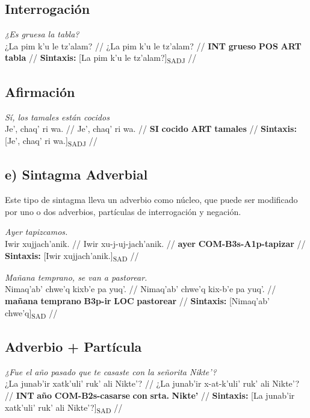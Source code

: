 \documentclass{article}%
\begin{document}
\subsection{Interrogación}%
\label{subsec:Interrogacin}%

%
\par\medskip%
\ex
\textit{¿Es gruesa la tabla?} \\
\begingl
\gla ¿La pim k'u le tz'alam? //
\glb ¿La pim k'u le tz'alam? //
\glc \textbf{INT} \textbf{grueso} \textbf{POS} \textbf{ART} \textbf{tabla} //
\glft \textbf{Sintaxis:} [La pim k'u le tz'alam?]\textsubscript{SADJ} //
\endgl
\xe
%
\medskip%
\subsection{Afirmación}%
\label{subsec:Afirmacin}%

%
\par\medskip%
\ex
\textit{Sí, los tamales están cocidos} \\
\begingl
\gla Je', chaq' ri wa. //
\glb Je', chaq' ri wa. //
\glc \textbf{SI} \textbf{cocido} \textbf{ART} \textbf{tamales} //
\glft \textbf{Sintaxis:} [Je', chaq' ri wa.]\textsubscript{SADJ} //
\endgl
\xe
%
\medskip%
\subsection{e) Sintagma Adverbial}%
\label{subsec:e)SintagmaAdverbial}%

%
Este tipo de sintagma lleva un adverbio como núcleo, que puede ser modificado por uno %
o dos adverbios, partículas de interrogación y negación. %
\par\medskip%
\ex
\textit{Ayer tapizcamos.} \\
\begingl
\gla Iwir xujjach'anik. //
\glb Iwir xu-j-uj-jach'anik. //
\glc \textbf{ayer} \textbf{COM-}\textbf{B3s-}\textbf{A1p-}\textbf{tapizar} //
\glft \textbf{Sintaxis:} [Iwir xujjach'anik.]\textsubscript{SAD} //
\endgl
\xe
%
\medskip%
\par\medskip%
\ex
\textit{Mañana temprano, se van a pastorear.} \\
\begingl
\gla Nimaq'ab' chwe'q kixb'e pa yuq'. //
\glb Nimaq'ab' chwe'q kix-b'e pa yuq'. //
\glc \textbf{mañana} \textbf{temprano} \textbf{B3p-}\textbf{ir} \textbf{LOC} \textbf{pastorear} //
\glft \textbf{Sintaxis:} [Nimaq'ab' chwe'q]\textsubscript{SAD} //
\endgl
\xe
%
\medskip%
\subsection{Adverbio + Partícula}%
\label{subsec:Adverbio+Partcula}%

%
\par\medskip%
\ex
\textit{¿Fue el año pasado que te casaste con la señorita Nikte'?} \\
\begingl
\gla ¿La junab'ir xatk'uli' ruk' ali Nikte'? //
\glb ¿La junab'ir x-at-k'uli' ruk' ali Nikte'? //
\glc \textbf{INT} \textbf{año} \textbf{COM-}\textbf{B2s-}\textbf{casarse} \textbf{con} \textbf{srta.} \textbf{Nikte'} //
\glft \textbf{Sintaxis:} [La junab'ir xatk'uli' ruk' ali Nikte'?]\textsubscript{SAD} //
\endgl
\xe
%
\medskip

%
\end{document}
